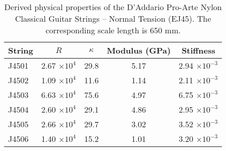 \begin{table}%
  \centering
  \caption{\label{tbl:ej45_props} Derived physical properties of the D'Addario Pro-Arte Nylon Classical Guitar Strings -- Normal Tension (EJ45). The corresponding scale length is 650 mm.}
    \begin{tabular}{lcccc}
    \hline \hline
    String  & $R$ & $\kappa$ & Modulus (GPa) & Stiffness \\
    \hline
    J4501 & 2.67 $\times 10^{4}$ & 29.8 & 5.17 & 2.94 $\times 10^{-3}$ \\
    J4502 & 1.09 $\times 10^{4}$ & 11.6 & 1.14 & 2.11 $\times 10^{-3}$ \\
    J4503 & 6.63 $\times 10^{4}$ & 75.6 & 4.97 & 6.75 $\times 10^{-3}$ \\
    J4504 & 2.60 $\times 10^{4}$ & 29.1 & 4.86 & 2.95 $\times 10^{-3}$ \\
    J4505 & 2.66 $\times 10^{4}$ & 29.7 & 3.02 & 3.52 $\times 10^{-3}$ \\
    J4506 & 1.40 $\times 10^{4}$ & 15.2 & 1.01 & 3.20 $\times 10^{-3}$ \\
    \hline
    \end{tabular}%
  \label{tab:addlabel}%
\end{table}%

